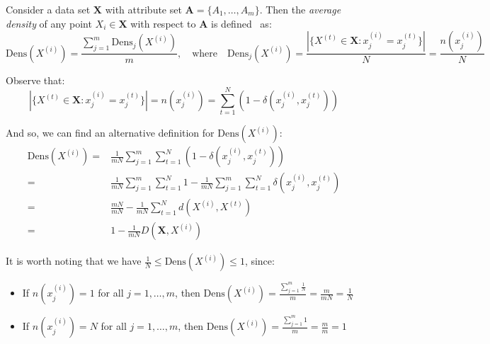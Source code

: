\begin{definition}\label{def:density}	
    Consider a data set \(\textbf{X}\) with attribute set \(\textbf{A} = 
    \{A_1, \ldots, A_m\}\). Then the \emph{average density} of any point 
    \(X_i \in \textbf{X}\) with respect to \(\textbf{A}\) is 
    defined~\cite{Cao09} as:
	\[
	    \text{Dens}(X^{(i)}) = \frac{\sum_{j=1}^m \text{Dens}_{j}(X^{(i)})}{m}, 
        \quad \text{where} \quad \text{Dens}_{j}(X^{(i)}) = \frac{|\{X^{(t)} \in 
        \textbf{X} : x_j^{(i)} = x_j^{(t)}\}|}{N} = \frac{n(x_j^{(i)})}{N}
	\]

    Observe that:
    \[
	    |\{X^{(t)} \in \textbf{X} : x_j^{(i)} = x_j^{(t)}\}| = n(x_j^{(i)}) = 
	    \sum_{t=1}^N (1 - \delta(x_j^{(i)}, x_j^{(t)}))
    \]

    And so, we can find an alternative definition for \(\text{Dens}(X^{(i)})\):
    \begin{equation}\label{eq:alt-def}
    \begin{aligned}
        \text{Dens}(X^{(i)}) = {} & {} \frac{1}{mN} \sum_{j=1}^m \sum_{t=1}^N (1
        - \delta(x_j^{(i)}, x_j^{(t)}))
        \\
        = {} & {} \frac{1}{mN} \sum_{j=1}^m \sum_{t=1}^N 1 - \frac{1}{mN}
        \sum_{j=1}^m \sum_{t=1}^N \delta(x_j^{(i)}, x_j^{(t)})
        \\
        = {} & {} \frac{mN}{mN} - \frac{1}{mN} \sum_{t=1}^N d(X^{(i)}, X^{(t)})
        \\
        = {} & {} 1 - \frac{1}{mN} D(\textbf{X}, X^{(i)})
    \end{aligned}
    \end{equation}
\end{definition}

\begin{remark}
    It is worth noting that we have \(\frac{1}{N} \leq \text{Dens}(X^{(i)})
    \leq 1\), since:		
	\begin{itemize}	
        \item If \(n(x_j^{(i)}) = 1\) for all \(j = 1, \ldots, m\), then
            \(\text{Dens}(X^{(i)}) = \frac{\sum_{j=1}^m \frac{1}{N}}{m} =
            \frac{m}{mN} = \frac{1}{N}\)
        \item If \(n(x_j^{(i)}) = N\) for all \(j = 1, \ldots, m\), then
            \(\text{Dens}(X^{(i)}) = \frac{\sum_{j=1}^m 1}{m} = \frac{m}{m} =
            1\)
	\end{itemize}
\end{remark}

\begin{singlespace}
    
\end{singlespace}

